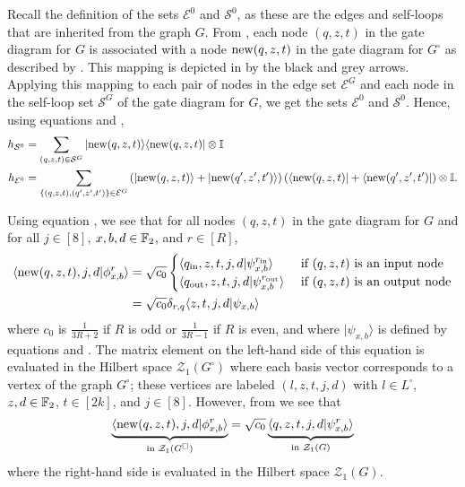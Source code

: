 \documentclass[../thesis-main/thesis-main]{subfiles}
\begin{document}
Recall the definition of the sets $\mathcal{E}^{0}$ and $\mathcal{S}^{0}$, as these are the edges and self-loops that are inherited from the graph $G$. From , each node $(q,z,t)$ in the gate diagram for $G$ is associated with a node $\operatorname{new}(q,z,t)$ in the gate diagram for $G^{\square}$ as described by . This mapping is depicted in  by the black and grey arrows. Applying this mapping to each pair of nodes in the edge set $\mathcal{E}^{G}$ and each node in the self-loop set $\mathcal{S}^{G}$ of the gate diagram for $G$, we get the sets $\mathcal{E}^{0}$ and $\mathcal{S}^{0}$. Hence, using equations  and ,
\begin{align}
h_{\mathcal{S}^0} &=\sum_{(q,z,t)\in \mathcal{S}^G} |{\operatorname{new}(q,z,t)}\rangle\langle{\operatorname{new}(q,z,t)}|\otimes \mathbb{I} \label{eq:hS0}\\
h_{\mathcal{E}^0} &=\sum_{\{(q,z,t),(q^\prime,z^\prime,t^\prime)\}\in \mathcal{E}^G} \left(|{\operatorname{new}(q,z,t)}\rangle+|{\operatorname{new}(q^\prime,z^\prime,t^\prime)}\rangle\right)\left(\langle{\operatorname{new}(q,z,t)}|+\langle{\operatorname{new}(q^\prime,z^\prime,t^\prime)}|\right)\otimes \mathbb{I}.\label{eq:hE0}
\end{align}

Using equation , we see that for all nodes $(q,z,t)$ in the gate diagram for $G$ and for all $j\in[8]$, $x,b,d\in\mathbb{F}_2$, and $r\in[R]$,
\begin{align}
  \langle{\operatorname{new}(q,z,t),j,d}|\phi^r_{x,b}\rangle & =\sqrt{c_0}
    \begin{cases}
      \langle q_{\mathrm{in}},z,t,j,d|\psi^{r_{\mathrm{in}}}_{x,b}\rangle & \text{ if $(q,z,t)$ is an input node}\\
      \langle q_{\mathrm{out}},z,t,j,d|\psi^{r_{\mathrm{out}}}_{x,b}\rangle & \text{ if $(q,z,t)$ is an output node}
    \end{cases}\nonumber \\
  &=\sqrt{c_0}\delta_{r,q} \langle z,t,j,d|\psi_{x,b}\rangle
  \label{eq:mat_el_newnodes}
\end{align}
where $c_0$ is $\frac{1}{3R+2}$ if $R$ is odd or $\frac{1}{3R-1}$ if $R$ is even, and where $|\psi_{x,b}\rangle$ is defined by equations  and . The matrix element on the left-hand side of this equation is evaluated in the Hilbert space $\mathcal{Z}_1 (G^\square)$ where each basis vector corresponds to a vertex of the graph $G^\square$; these vertices are labeled $(l,z,t,j,d)$ with $l\in L^\square$, $z,d\in \mathbb{F}_2$, $t\in[2k]$, and $j\in[8]$. However, from  we see that
\begin{equation}
  \underbrace{\langle \operatorname{new}(q,z,t),j,d|\phi^r_{x,b}\rangle}_{\text{in } \mathcal{Z}_1 (G^\square)}=\sqrt{c_0}\underbrace{\langle q,z,t,j,d|\psi^r_{x,b}\rangle}_{\text{in } \mathcal{Z}_1 (G)} \label{eq:twoHspaces}
\end{equation}
where the right-hand side is evaluated in the Hilbert space $\mathcal{Z}_1 (G)$.
\end{document}
